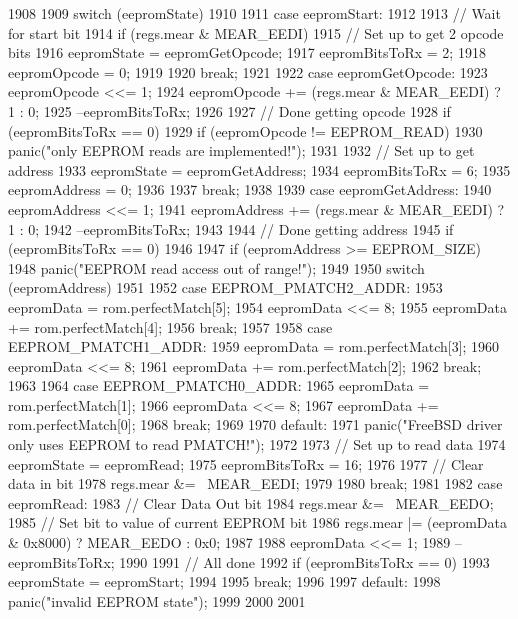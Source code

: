 \begin{DoxyCode}
1908 {
1909     switch (eepromState) {
1910 
1911       case eepromStart:
1912 
1913         // Wait for start bit
1914         if (regs.mear & MEAR_EEDI) {
1915             // Set up to get 2 opcode bits
1916             eepromState = eepromGetOpcode;
1917             eepromBitsToRx = 2;
1918             eepromOpcode = 0;
1919         }
1920         break;
1921 
1922       case eepromGetOpcode:
1923         eepromOpcode <<= 1;
1924         eepromOpcode += (regs.mear & MEAR_EEDI) ? 1 : 0;
1925         --eepromBitsToRx;
1926 
1927         // Done getting opcode
1928         if (eepromBitsToRx == 0) {
1929             if (eepromOpcode != EEPROM_READ)
1930                 panic("only EEPROM reads are implemented!");
1931 
1932             // Set up to get address
1933             eepromState = eepromGetAddress;
1934             eepromBitsToRx = 6;
1935             eepromAddress = 0;
1936         }
1937         break;
1938 
1939       case eepromGetAddress:
1940         eepromAddress <<= 1;
1941         eepromAddress += (regs.mear & MEAR_EEDI) ? 1 : 0;
1942         --eepromBitsToRx;
1943 
1944         // Done getting address
1945         if (eepromBitsToRx == 0) {
1946 
1947             if (eepromAddress >= EEPROM_SIZE)
1948                 panic("EEPROM read access out of range!");
1949 
1950             switch (eepromAddress) {
1951 
1952               case EEPROM_PMATCH2_ADDR:
1953                 eepromData = rom.perfectMatch[5];
1954                 eepromData <<= 8;
1955                 eepromData += rom.perfectMatch[4];
1956                 break;
1957 
1958               case EEPROM_PMATCH1_ADDR:
1959                 eepromData = rom.perfectMatch[3];
1960                 eepromData <<= 8;
1961                 eepromData += rom.perfectMatch[2];
1962                 break;
1963 
1964               case EEPROM_PMATCH0_ADDR:
1965                 eepromData = rom.perfectMatch[1];
1966                 eepromData <<= 8;
1967                 eepromData += rom.perfectMatch[0];
1968                 break;
1969 
1970               default:
1971                 panic("FreeBSD driver only uses EEPROM to read PMATCH!");
1972             }
1973             // Set up to read data
1974             eepromState = eepromRead;
1975             eepromBitsToRx = 16;
1976 
1977             // Clear data in bit
1978             regs.mear &= ~MEAR_EEDI;
1979         }
1980         break;
1981 
1982       case eepromRead:
1983         // Clear Data Out bit
1984         regs.mear &= ~MEAR_EEDO;
1985         // Set bit to value of current EEPROM bit
1986         regs.mear |= (eepromData & 0x8000) ? MEAR_EEDO : 0x0;
1987 
1988         eepromData <<= 1;
1989         --eepromBitsToRx;
1990 
1991         // All done
1992         if (eepromBitsToRx == 0) {
1993             eepromState = eepromStart;
1994         }
1995         break;
1996 
1997       default:
1998         panic("invalid EEPROM state");
1999     }
2000 
2001 }
\end{DoxyCode}
